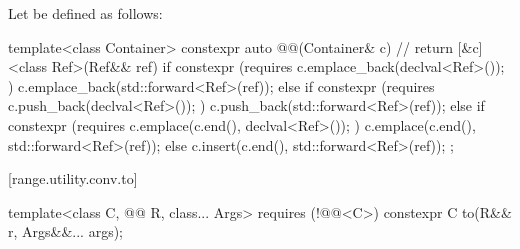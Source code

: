 \pnum
Let  be defined as follows:
\begin{codeblock}
template<class Container>
constexpr auto @@(Container& c) {                    // \expos
  return [&c]<class Ref>(Ref&& ref) {
    if constexpr (requires { c.emplace_back(declval<Ref>()); })
      c.emplace_back(std::forward<Ref>(ref));
    else if constexpr (requires { c.push_back(declval<Ref>()); })
      c.push_back(std::forward<Ref>(ref));
    else if constexpr (requires { c.emplace(c.end(), declval<Ref>()); })
      c.emplace(c.end(), std::forward<Ref>(ref));
    else
      c.insert(c.end(), std::forward<Ref>(ref));
  };
}
\end{codeblock}

[range.utility.conv.to]{}

%
\begin{itemdecl}
template<class C, @@ R, class... Args> requires (!@@<C>)
  constexpr C to(R&& r, Args&&... args);
\end{itemdecl}

